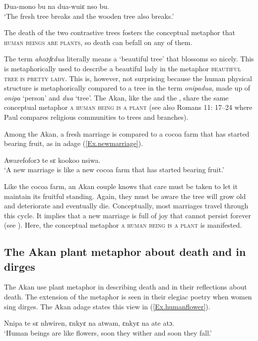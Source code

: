 \documentclass[output=paper,colorlinks,citecolor=brown]{langscibook}
\begin{document}
\ea \label{Ex.freshtree}
\gl Dua-mono	 bu 	na 	dua-wuiɛ 	nso 	bu.\\
\glt  ‘The fresh tree breaks and the wooden tree also breaks.’
\z

The death of the two contrastive trees fosters the conceptual metaphor that \textsc{human beings are plants}, so death can befall on any of them.

The term \textit{ahoɔfɛdua} literally means a `beautiful tree’ that blossoms so nicely. This is metaphorically used to describe a beautiful lady in the metaphor \textsc{beautiful tree is pretty lady}. This is, however, not surprising because the human physical structure is metaphorically compared to a tree in the term \textit{onipadua}, made up of \textit{onipa} `person’ and \textit{dua} `tree'. The Akan, like the  and the , share the same conceptual metaphor \textsc{a human being is a plant} (see also Romans 11: 17--24 where Paul compares religious communities to trees and branches).
	
Among the Akan, a fresh marriage is compared to a cocoa farm that has started bearing fruit, as in adage (\ref{Ex.newmarriage}). 

\ea \label{Ex.newmarriage}
\gl Awarefoforɔ te sɛ kookoo nsiwa.\\
\glt  ‘A new marriage is like a new cocoa farm that has started bearing fruit.’
\z

Like the cocoa farm, an Akan couple knows that care must be taken to let it maintain its fruitful standing. Again, they must be aware the tree will grow old and deteriorate and eventually die. Conceptually, most marriages travel through this cycle. It implies that a new marriage is full of joy that cannot persist forever (see \cite{Agyekum2012}). Here, the conceptual metaphor \textsc{a human being is a plant} is manifested. 

\subsection{The Akan plant metaphor about death and in dirges}

The Akan use plant metaphor in describing death and in their reflections about death. The extension of the metaphor is seen in their elegiac poetry when women sing dirges. The Akan adage states this view in (\ref{Ex.humanflower}).

\ea \label{Ex.humanflower}
\gl Nnipa te sɛ nhwiren, ɛnkyɛ na atwam, ɛnkyɛ na ate atɔ.\\
\glt  ‘Human beings are like flowers, soon they wither and soon they fall.’
\z
\end{document}
